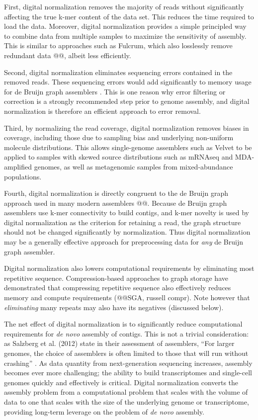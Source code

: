 \documentclass[10pt]{article}
\begin{document}
First, digital normalization removes the majority of reads without
significantly affecting the true k-mer content of the data set.  This
reduces the time required to load the data.  Moreover, digital
normalization provides a simple principled way to combine data from
multiple samples to maximize the sensitivity of assembly.  This is
similar to approaches such as Fulcrum, which also losslessly remove
redundant data @@, albeit less efficiently.

Second, digital normalization eliminates sequencing errors contained
in the removed reads.  These sequencing errors would add significantly
to memory usage for de Bruijn graph assemblers \cite{pubmed21245053}.
This is one reason why error filtering or correction is a strongly
recommended step prior to genome assembly, and digital normalization
is therefore an efficient approach to error removal.

Third, by normalizing the read coverage, digital normalization
removes biases in coverage, including those due to sampling bias and
underlying non-uniform molecule distributions.  This allows
single-genome assemblers such as Velvet to be applied to samples with
skewed source distributions such as mRNAseq and MDA-amplified genomes,
as well as metagenomic samples from mixed-abundance populations.

Fourth, digital normalization is directly congruent to the de Bruijn
graph approach used in many modern assemblers @@.  Because de Bruijn
graph assemblers use k-mer connectivity to build contigs, and k-mer
novelty is used by digital normalization as the criterion for
retaining a read, the graph structure should not be changed
significantly by normalization.  Thus digital normalization may be a
generally effective approach for preprocessing data for {\em any} de
Bruijn graph assembler.

Digital normalization also lowers computational requirements by
eliminating most repetitive sequence.  Compression-based approaches to
graph storage have demonstrated that compressing repetitive sequence
also effectively reduces memory and compute requirements (@@SGA,
russell compr).  Note however that {\em eliminating} many repeats may also
have its negatives (discussed below).


The net effect of digital normalization is to significantly reduce
computational requirements for {\em de novo} assembly of contigs.
This is not a trivial consideration: as Salzberg et al. (2012) state
in their assessment of assemblers, ``For larger genomes, the choice of
assemblers is often limited to those that will run without crashing''
\cite{pubmed22147368}.  As data quantity from next-generation
sequencing increases, assembly becomes ever more challenging; the
ability to build transcriptomes and single-cell genomes quickly and
effectively is critical.  Digital normalization converts the assembly
problem from a computational problem that scales with the volume of
data to one that scales with the size of the underlying genome or
transcriptome, providing long-term leverage on the problem of {\em de
  novo} assembly.
\end{document}

